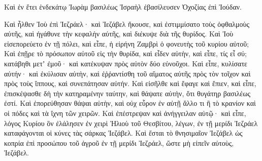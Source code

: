 {\par }{\PP {}Καὶ ἐν ἔτει ἑνδεκάτῳ Ἰωρὰμ βασιλέως Ἰσραὴλ ἐβασίλευσεν Ὀχοζίας ἐπὶ Ἰούδαν.
\par }{\PP {}Καὶ ἦλθεν Ἰοὺ ἐπὶ Ἰεζράελ· καὶ Ἰεζάβελ ἤκουσε, καὶ ἐστιμμίσατο τοὺς ὀφθαλμοὺς αὐτῆς, καὶ ἠγάθυνε τὴν κεφαλὴν αὐτῆς, καὶ διέκυψε διὰ τῆς θυρίδος.
Καὶ Ἰοὺ εἰσεπορεύετο ἐν τῇ πόλει, καὶ εἶπε, ἡ εἰρήνη Ζαμβρὶ ὁ φονευτὴς τοῦ κυρίου αὐτοῦ;
Καὶ ἐπῇρε τὸ πρόσωπον αὐτοῦ εἰς τὴν θυρίδα, καὶ εἶδεν αὐτὴν, καὶ εἶπε, τίς εἶ σύ; κατάβηθι μετʼ ἐμοῦ· καὶ κατέκυψαν πρὸς αὐτὸν δύο εὐνοῦχοι.
Καὶ εἶπε, κυλίσατε αὐτήν· καὶ ἐκύλισαν αὐτὴν, καὶ ἐῤῥαντίσθη τοῦ αἵματος αὐτῆς πρὸς τὸν τοῖχον καὶ πρὸς τοὺς ἵππους, καὶ συνεπάτησαν αὐτήν.
Καὶ εἰσῆλθε καὶ ἔφαγε καὶ ἔπιεν, καὶ εἶπε, ἐπισκέψασθε δὴ τὴν κατηραμένην ταύτην, καὶ θάψατε αὐτὴν, ὅτι θυγάτηρ βασιλέως ἐστί.
Καὶ ἐπορεύθησαν θάψαι αὐτὴν, καὶ οὐχ εὗρον ἐν αὐτῇ ἄλλο τι ἢ τὸ κρανίον καὶ οἱ πόδες καὶ τὰ ἴχνη τῶν χειρῶν.
Καὶ ἐπέστρεψαν καὶ ἀνήγγειλαν αὐτῷ· καὶ εἶπε, λόγος Κυρίου ὃν ἐλάλησεν ἐν χειρὶ Ἠλιοὺ τοῦ Θεσβίτου, λέγων, ἐν τῇ μερίδι Ἰεζράελ καταφάγονται οἱ κύνες τὰς σάρκας Ἰεζάβελ.
Καὶ ἔσται τὸ θνησιμαῖον Ἰεζάβελ ὡς κοπρία ἐπὶ προσώπου τοῦ ἀγροῦ ἐν τῇ μερίδι Ἰεζράελ, ὥστε μὴ εἰπεῖν αὐτοὺς, Ἰεζάβελ.

}
